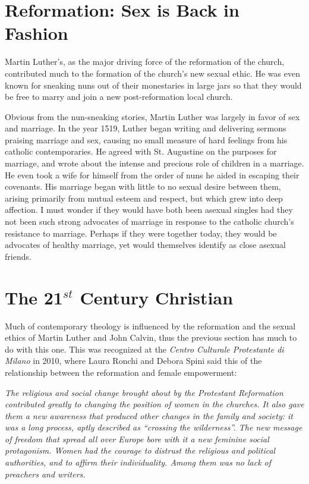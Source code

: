 \documentclass[12pt]{article}
\begin{document}
\section{Reformation: Sex is Back in Fashion}

    Martin Luther's, as the major driving force of the reformation 
    of the church, contributed much to the formation of the church's new
    sexual ethic. He was even known for sneaking nuns out of their 
    monestaries in large jars so that they would be free to marry and
    join a new post-reformation local church.

    \par Obvious from the nun-sneaking stories, Martin Luther was
        largely in favor of sex and marriage. In the year 1519, Luther
        began writing and delivering sermons praising marriage and sex,
        causing no small measure of hard feelings from his catholic
        contemporaries\cite{luthersex}. He agreed with St. Augustine on
        the purposes for marriage, and wrote about the intense and 
        precious role of children in a marriage. He even took a wife for
        himself from the order of nuns he aided in escaping their
        covenants. His marriage began with little to no sexual desire
        between them, arising primarily from mutual esteem and respect, but
        which grew into deep affection. I must wonder if they would have
        both been asexual singles had they not been such strong advocates
        of marriage in response to the catholic church's resistance to
        marriage. Perhaps if they were together today, they would be
        advocates of healthy marriage, yet would themselves identify
        as close asexual friends. 


\section{The 21$^{st}$ Century Christian}

    \par Much of contemporary theology is influenced by the reformation
        and the sexual ethics of Martin Luther and John Calvin, thus 
        the previous section has much to do with this one. This was 
        recognized at the \textit{Centro Culturale Protestante di Milano} 
        in 2010,
        where Laura Ronchi and Debora Spini said this of the relationship
        between the reformation and female empowerment:
        \par \textit{The religious and social change brought about by the 
        Protestant Reformation contributed greatly to changing the position 
        of women in the churches. It also gave them a new awareness 
        that produced other changes in the family and society: it was 
        a long process, aptly described as “crossing the wilderness”. The 
        new message of freedom that spread all over Europe bore with it a 
        new feminine social protagonism. Women had the courage to distrust 
        the religious and political authorities, and to affirm their 
        individuality. Among them was no lack of preachers and writers.}
        \cite{free2013}\cite{lutherfem}
\end{document}
